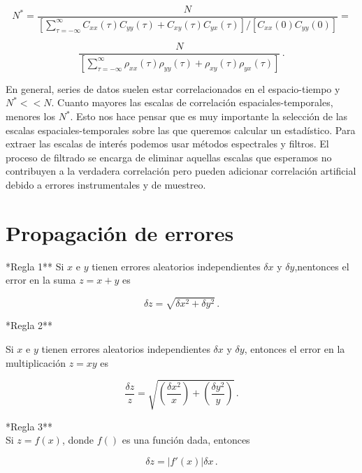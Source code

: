 \documentclass[
]{agujournal2019}
\begin{document}
\[N^{*}=\frac{N}{\left[ \sum\limits^{\infty}_{\tau=-\infty}
C_{xx}(\tau)C_{yy}(\tau) + C_{xy}(\tau)C_{yx}(\tau)
\right]/\left[ C_{xx}(0)C_{yy}(0)\right]}=\]

\[\frac{N}{\left[\sum\limits^{\infty}_{\tau=-\infty}
               \rho_{xx}(\tau)\rho_{yy}(\tau) +
           \rho_{xy}(\tau)\rho_{yx}(\tau)\right]}\,.\]

\noindent En general, series de datos suelen estar correlacionados en el
espacio-tiempo y \(N^{*}<<N\). Cuanto mayores las escalas de correlación
espaciales-temporales, menores los \(N^*\). Esto nos hace pensar que es
muy importante la selección de las escalas espaciales-temporales sobre
las que queremos calcular un estadístico. Para extraer las escalas de
interés podemos usar métodos espectrales y filtros. El proceso de
filtrado se encarga de eliminar aquellas escalas que esperamos no
contribuyen a la verdadera correlación pero pueden adicionar correlación
artificial debido a errores instrumentales y de muestreo.

\section{Propagación de errores}\label{propagaciuxf3n-de-errores}

\vspace{0.5cm}

\noindent **Regla 1** \noindent Si \(x\) e \(y\) tienen errores
aleatorios independientes \(\delta{x}\) y \(\delta{y}\),nentonces el
error en la suma \(z=x+y\) es

\[\delta{z}=\sqrt{\delta{x}^2 + \delta{y}^2}\,.\]

\vspace{0.5cm}

\noindent **Regla 2**

\noindent Si \(x\) e \(y\) tienen errores aleatorios independientes
\(\delta{x}\) y \(\delta{y}\), entonces el error en la multiplicación
\(z=xy\) es

\[\frac{\delta{z}}{z}=\sqrt{\left(\frac{\delta{x}^2}{x}\right) + \left(\frac{\delta{y}^2}{y}\right)}\,.\]

\vspace{0.5cm}

\noindent **Regla 3**\\

\noindent Si \(z=f(x)\), donde \(f()\) es una función dada, entonces

\[\delta{z}=|f'(x)|\delta{x}\,.\]

\vspace{0.5cm}
\end{document}
